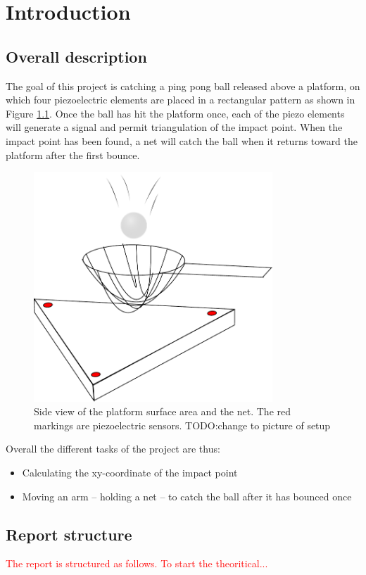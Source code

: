 \chapter{Introduction}
\label{chap:introduction}

	\section{Overall description}
		The goal of this project is catching a ping pong ball released above a platform, on which four piezoelectric elements are placed in a rectangular pattern as shown in Figure \ref{fig:sideview}. Once the ball has hit the platform once, each of the piezo elements will generate a signal and permit triangulation of the impact point. When the impact point has been found, a net will catch the ball when it returns toward the platform after the first bounce.

		\begin{figure}[htb]
			\centering
			\includegraphics[width=0.8\textwidth]{figures/sideview}
			\caption{Side view of the platform surface area and the net. The red markings are piezoelectric sensors. TODO:change to picture of setup}
			\label{fig:sideview}
		\end{figure}

		Overall the different tasks of the project are thus:
		\begin{itemize}
			\item Calculating the xy-coordinate of the impact point
			\item Moving an arm -- holding a net -- to catch the ball after it has bounced once
		\end{itemize}

	\section{Report structure}
	\label{sec:reportStructure}
		\textcolor{red}{The report is structured as follows. To start the theoritical...}